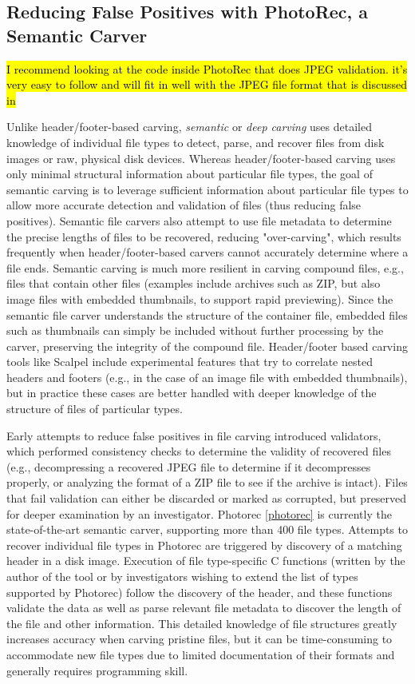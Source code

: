 \subsection{Reducing False Positives with PhotoRec, a Semantic Carver}

\hl{I recommend looking at the code inside PhotoRec that does JPEG
  validation. it's very easy to follow and will fit in well with the
  JPEG file format that is discussed in} 

Unlike header/footer-based carving, \emph{semantic} or \emph{deep
  carving} uses detailed knowledge of individual file types to detect,
parse, and recover files from disk images or raw, physical disk
devices.  Whereas header/footer-based carving uses only minimal
structural information about particular file types, the goal of
semantic carving is to leverage sufficient information about
particular file types to allow more accurate detection and validation
of files (thus reducing false positives).  Semantic file carvers also
attempt to use file metadata to determine the precise lengths of files
to be recovered, reducing "over-carving", which results frequently
when header/footer-based carvers cannot accurately determine where a
file ends.  Semantic carving is much more resilient in carving
compound files, e.g., files that contain other files (examples include
archives such as ZIP, but also image files with embedded thumbnails,
to support rapid previewing).  Since the semantic file carver
understands the structure of the container file, embedded files such
as thumbnails can simply be included without further processing by the
carver, preserving the integrity of the compound file.  Header/footer
based carving tools like Scalpel include experimental features that
try to correlate nested headers and footers (e.g., in the case of an
image file with embedded thumbnails), but in practice these cases are
better handled with deeper knowledge of the structure of files of
particular types.

Early attempts to reduce false positives in file carving introduced
validators, which performed consistency checks to determine the
validity of recovered files (e.g., decompressing a recovered JPEG file
to determine if it decompresses properly, or analyzing the format of a
ZIP file to see if the archive is intact).  Files that fail validation
can either be discarded or marked as corrupted, but preserved for
deeper examination by an investigator.  Photorec \ref{photorec} is
currently the state-of-the-art semantic carver, supporting more than
400 file types.  Attempts to recover individual file types in Photorec
are triggered by discovery of a matching header in a disk image.
Execution of file type-specific C functions (written by the author of
the tool or by investigators wishing to extend the list of types
supported by Photorec) follow the discovery of the header, and these
functions validate the data as well as parse relevant file metadata to
discover the length of the file and other information.  This detailed
knowledge of file structures greatly increases accuracy when carving
pristine files, but it can be time-consuming to accommodate new file
types due to limited documentation of their formats and generally
requires programming skill.


